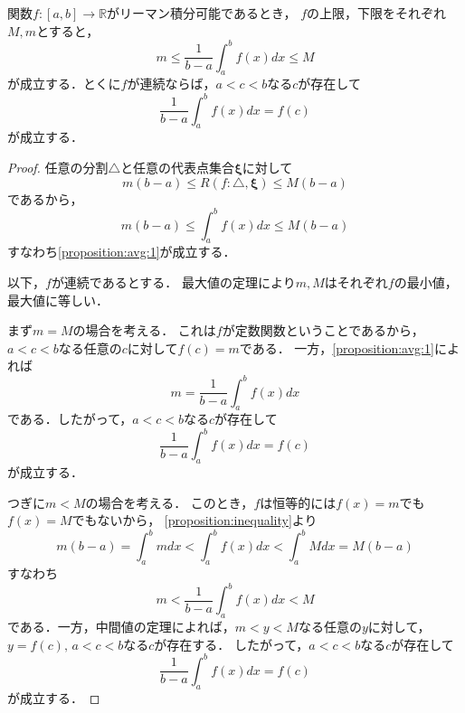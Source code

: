 \documentclass[./index]{subfiles}
\begin{document}
\begin{screen}
    \begin{proposition}
        関数$f: [a, b] \rightarrow \mathbb{R}$がリーマン積分可能であるとき，
        $f$の上限，下限をそれぞれ$M, m$とすると，
        \begin{equation}
            \label{proposition:avg:1}
            m \le \frac{1}{b - a} \int_a^b f(x) dx \le M
        \end{equation}
        が成立する．とくに$f$が連続ならば，$a < c < b$なる$c$が存在して
        \begin{equation}
            \frac{1}{b - a} \int_a^b f(x) dx = f(c)
        \end{equation}
        が成立する．
    \end{proposition}
\end{screen}

\begin{proof}
    任意の分割$\triangle$と任意の代表点集合$\mathbf{\xi}$に対して
    \begin{equation}
        m(b-a) \le R(f: \triangle, \mathbf{\xi}) \le M(b-a)
    \end{equation}
    であるから，
    \begin{equation}
        m(b-a) \le \int_a^b f(x) dx \le M(b-a)
    \end{equation}
    すなわち\cref{proposition:avg:1}が成立する．

    以下，$f$が連続であるとする．
    最大値の定理により$m, M$はそれぞれ$f$の最小値，最大値に等しい．

    まず$m = M$の場合を考える．
    これは$f$が定数関数ということであるから，
    $a < c < b$なる任意の$c$に対して$f(c) = m$である．
    一方，\cref{proposition:avg:1}によれば
    \begin{equation}
        m = \frac{1}{b - a} \int_a^b f(x) dx
    \end{equation}
    である．したがって，$a < c < b$なる$c$が存在して
    \begin{equation}
        \frac{1}{b - a} \int_a^b f(x) dx = f(c)
    \end{equation}
    が成立する．

    つぎに$m < M$の場合を考える．
    このとき，$f$は恒等的には$f(x) = m$でも$f(x) = M$でもないから，
    \cref{proposition:inequality}より
    \begin{equation}
        m(b-a) = \int_a^b m dx < \int_a^b f(x) dx < \int_a^b M dx = M(b-a)
    \end{equation}
    すなわち
    \begin{equation}
        m < \frac{1}{b-a} \int_a^b f(x) dx < M
    \end{equation}
    である．一方，中間値の定理によれば，$m < y < M$なる任意の$y$に対して，
    $y = f(c),\, a < c < b$なる$c$が存在する．
    したがって，$a < c < b$なる$c$が存在して
    \begin{equation}
        \frac{1}{b - a} \int_a^b f(x) dx = f(c)
    \end{equation}
    が成立する．
\end{proof}
\end{document}
